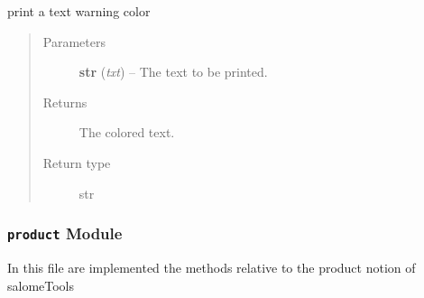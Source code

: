 \documentclass[a4paper,10pt,english]{sphinxmanual}
\begin{document}

\begin{fulllineitems}
\label{commands/apidoc/src:src.printcolors.printcWarning}
print a text warning color
\begin{quote}\begin{description}
\item[{Parameters}] \leavevmode
\textbf{str} (\emph{txt}) -- The text to be printed.

\item[{Returns}] \leavevmode
The colored text.

\item[{Return type}] \leavevmode
str

\end{description}\end{quote}

\end{fulllineitems}



\subsubsection{\texttt{product} Module}
\label{commands/apidoc/src:module-src.product}\label{commands/apidoc/src:product-module}
In this file are implemented the methods 
relative to the product notion of salomeTools
\end{document}
